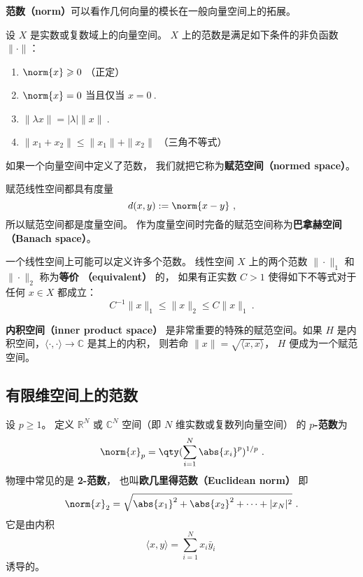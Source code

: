
\begin{issues}
\issueDraft
\end{issues}



\textbf{范数（norm）}可以看作几何向量的模长在一般向量空间上的拓展。
\begin{definition}{}\label{def_NormV_1}
设 $X$ 是实数或复数域上的向量空间。 $X$ 上的范数是满足如下条件的非负函数 $\|\cdot\|$：
\begin{enumerate}
\item $\norm{x} \geqslant 0$ （正定）
\item $\norm{x} = 0$ 当且仅当 $x = 0~.$
\item $\|\lambda x\| = |\lambda|\|x\|~.$
\item $\|x_1+x_2\| \leqslant \|x_1\|+ \|x_2\|$ （三角不等式）
\end{enumerate}
如果一个向量空间中定义了范数， 我们就把它称为\textbf{赋范空间（normed space）}。
\end{definition}

赋范线性空间都具有度量
\begin{equation}
d(x,y) := \norm{x-y}~,
\end{equation}
所以赋范空间都是度量空间。 作为度量空间时完备的赋范空间称为\textbf{巴拿赫空间（Banach space）}。

一个线性空间上可能可以定义许多个范数。 线性空间 $X$ 上的两个范数 $\|\cdot\|_1$ 和 $\|\cdot\|_2$ 称为\textbf{等价 （equivalent）} 的， 如果有正实数 $C>1$ 使得如下不等式对于任何 $x\in X$ 都成立：
$$
C^{-1}\|x\|_{1}\leq\|x\|_2\leq C\|x\|_1~.
$$

\textbf{内积空间（inner product space）} 是非常重要的特殊的赋范空间。如果 $H$ 是内积空间，$\langle\cdot,\cdot\rangle\to\mathbb C$ 是其上的内积， 则若命 $\|x\|=\sqrt{\langle x,x\rangle }$， $H$ 便成为一个赋范空间。

\subsection{有限维空间上的范数}
设 $p\geq1$。 定义 $\mathbb R^N$ 或 $\mathbb C^N$ 空间（即 $N$ 维实数或复数列向量空间） 的 \textbf{$p$-范数}为
\begin{equation}
\norm{ x}_p = \qty(\sum_{i=1}^N \abs{x_i}^p)^{1/p}~.
\end{equation}
物理中常见的是 \textbf{2-范数}， 也叫\textbf{欧几里得范数（Euclidean norm）} 即
\begin{equation}
\norm{ x}_2 = \sqrt{\abs{x_1}^2 + \abs{x_2}^2 + \dots+|x_N|^2}~.
\end{equation}
它是由内积
$$
\langle x,y\rangle=\sum_{i=1}^Nx_i\bar y_i~
$$
诱导的。

